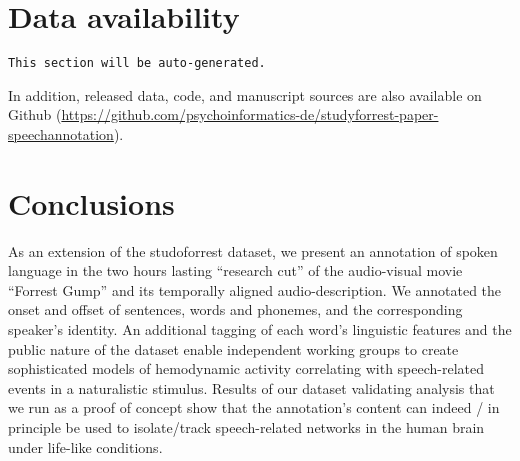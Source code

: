 \documentclass[10pt,a4paper,onecolumn]{article}
\begin{document}
\section*{Data availability}
\texttt{This section will be auto-generated.}

In addition, released data, code, and manuscript sources are also available on
Github (\url{https://github.com/psychoinformatics-de/studyforrest-paper-speechannotation}).

\section*{Conclusions}
As an extension of the studoforrest dataset, we present an annotation of spoken language in the two hours lasting ``research cut'' of the audio-visual movie ``Forrest Gump'' and its temporally aligned audio-description.
We annotated the onset and offset of sentences, words and phonemes, and the corresponding speaker's identity.
An additional tagging of each word's linguistic features and the public nature of the dataset enable independent working groups to create sophisticated models of hemodynamic activity correlating with speech-related events in a naturalistic stimulus.
Results of our dataset validating analysis that we run as a proof of concept show that the annotation's content can indeed / in principle be used to isolate/track speech-related networks in the human brain under life-like conditions.
\end{document}
